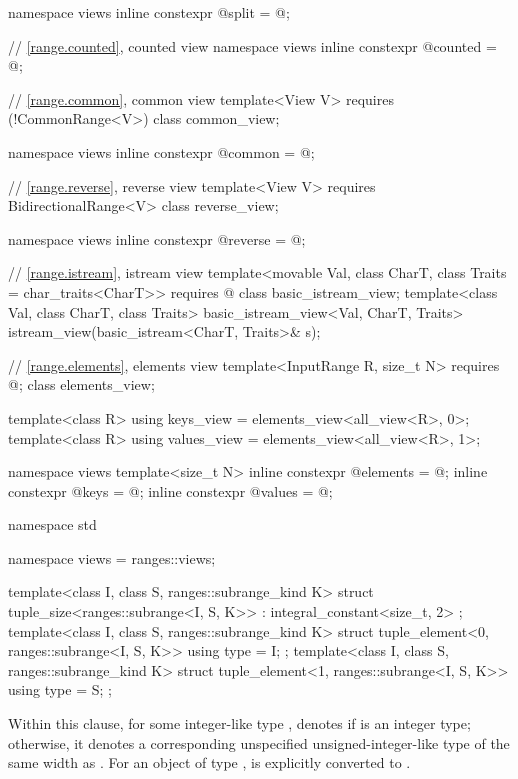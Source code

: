 \begin{codeblock}
{  namespace views { inline constexpr @\unspec@ split = @\unspec@; }

  // \ref{range.counted}, counted view
  namespace views { inline constexpr @\unspec@ counted = @\unspec@; }

  // \ref{range.common}, common view
  template<View V>
    requires (!CommonRange<V>)
  class common_view;

  namespace views { inline constexpr @\unspec@ common = @\unspec@; }

  // \ref{range.reverse}, reverse view
  template<View V>
    requires BidirectionalRange<V>
  class reverse_view;

  namespace views { inline constexpr @\unspec@ reverse = @\unspec@; }

  // \ref{range.istream}, istream view
  template<movable Val, class CharT, class Traits = char_traits<CharT>>
    requires @\seebelow@
  class basic_istream_view;
  template<class Val, class CharT, class Traits>
    basic_istream_view<Val, CharT, Traits> istream_view(basic_istream<CharT, Traits>& s);

  // \ref{range.elements}, elements view
  template<InputRange R, size_t N>
    requires @\seebelow@;
  class elements_view;

  template<class R>
    using keys_view = elements_view<all_view<R>, 0>;
  template<class R>
    using values_view = elements_view<all_view<R>, 1>;

  namespace views {
    template<size_t N>
      inline constexpr @\unspec@ elements = @\unspec@ ;
    inline constexpr @\unspec@ keys = @\unspec@ ;
    inline constexpr @\unspec@ values = @\unspec@ ;
  }
}

namespace std {
  namespace views = ranges::views;

  template<class I, class S, ranges::subrange_kind K>
  struct tuple_size<ranges::subrange<I, S, K>>
    : integral_constant<size_t, 2> {};
  template<class I, class S, ranges::subrange_kind K>
  struct tuple_element<0, ranges::subrange<I, S, K>> {
    using type = I;
  };
  template<class I, class S, ranges::subrange_kind K>
  struct tuple_element<1, ranges::subrange<I, S, K>> {
    using type = S;
  };
}
\end{codeblock}

\pnum
{}%
%
Within this clause,
for some integer-like type ,
 denotes
 if  is an integer type;
otherwise, it denotes a corresponding unspecified unsigned-integer-like type
of the same width as .
For an object  of type ,
 is
 explicitly converted to
.

